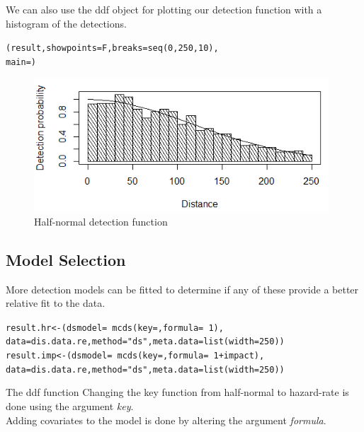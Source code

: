 \noindent We can also use the ddf object for plotting our detection function with a histogram of the detections. 
\begin{knitrout}\footnotesize
{}\color{fgcolor}
\begin{kframe}
\begin{alltt}
(result,showpoints=F,breaks=seq(0,250,10),
     main=)
\end{alltt}
\end{kframe}
\end{knitrout}
\begin{figure}[h]
  \centering
  \includegraphics[width=11cm]{HN_alldatacombined.png}
\caption{Half-normal detection function}
\label{fig:HN_all}
\end{figure}

\subsection{Model Selection}
\label{ss:modelselection}
More detection models can be fitted to determine if any of these provide a better relative fit to the data. 
\begin{knitrout}\footnotesize
{}\color{fgcolor}
\begin{kframe}
\begin{alltt}
result.hr <- (dsmodel=~mcds(key=, formula=~1), 
     data = dis.data.re, method="ds", meta.data=list(width=250))
result.imp <- (dsmodel=~mcds(key=, formula=~1+impact), 
     data = dis.data.re, method="ds", meta.data=list(width=250))
\end{alltt}
\end{kframe}
\end{knitrout}
\begin{block}{The ddf function}
Changing the key function from half-normal to hazard-rate is done using the argument \textit{key}.\\
Adding covariates to the model is done by altering the argument \textit{formula}.\\
\end{block}

